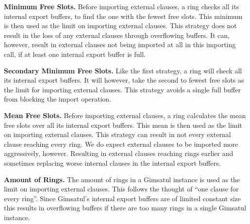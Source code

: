 \documentclass[12pt,a4paper,twoside]{scrartcl}
\numberwithin{equation}{section}
\begin{document}

\textbf{Minimum Free Slots.} Before importing external clauses, a ring checks all its internal export buffers, to find the one with the fewest free slots. This minimum is then used as the limit on importing external clauses.
This strategy does not result in the loss of any external clauses through overflowing buffers. It can, however, result in external clauses not being imported at all in this importing call, if at least one internal export buffer is full.

\textbf{Secondary Minimum Free Slots.} Like the first strategy, a ring will check all its internal export buffers. It will however, take the second to fewest free slots as the limit for importing external clauses. This strategy avoids a single full buffer from blocking the import operation.

\textbf{Mean Free Slots.} Before importing external clauses, a ring calculates the mean free slots over all its internal export buffers. This mean is then used as the limit on importing external clauses.
This strategy can result in not every external clause reaching every ring. We do expect external clauses to be imported more aggressively, however. Resulting in external clauses reaching rings earlier and sometimes replacing worse internal clauses in the internal export buffers.

\textbf{Amount of Rings.} The amount of rings in a Gimsatul instance is used as the limit on importing external clauses.
This follows the thought of ``one clause for every ring''. Since Gimsatul's internal export buffers are of limited constant size this results in overflowing buffers if there are too many rings in a single Gimsatul instance.
\end{document}
